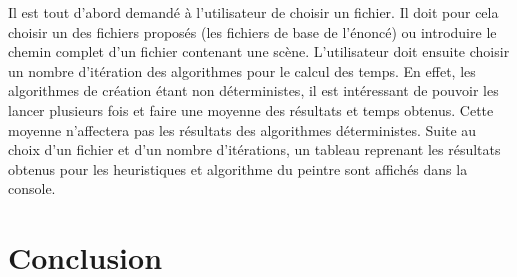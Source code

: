 \documentclass[11pt,a4paper]{article}
\theoremstyle{definition}
\theoremstyle{remark}
\begin{document}
Il est tout d'abord demandé à l'utilisateur de choisir un fichier. Il doit pour cela choisir un des fichiers proposés (les fichiers de base de l'énoncé) ou introduire le chemin complet d'un fichier contenant une scène. L'utilisateur doit ensuite choisir un nombre d'itération des algorithmes pour le calcul des temps. En effet, les algorithmes de création étant non déterministes, il est intéressant de pouvoir les lancer plusieurs fois et faire une moyenne des résultats et temps obtenus. Cette moyenne n'affectera pas les résultats des algorithmes déterministes. Suite au choix d'un fichier et d'un nombre d'itérations, un tableau reprenant les résultats obtenus pour les heuristiques et algorithme du peintre sont affichés dans la console.

\section*{Conclusion}

\end{document}
